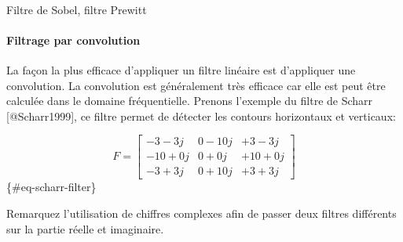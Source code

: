 \documentclass[11pt]{article}
\begin{document}
    \begin{center}
    \end{center}
    { \hspace*{\fill} \\}
    
    Filtre de Sobel, filtre Prewitt

\hypertarget{filtrage-par-convolution}{%
\paragraph{Filtrage par convolution}\label{filtrage-par-convolution}}

La façon la plus efficace d'appliquer un filtre linéaire est d'appliquer
une convolution. La convolution est généralement très efficace car elle
est peut être calculée dans le domaine fréquentielle. Prenons l'exemple
du filtre de Scharr {[}@Scharr1999{]}, ce filtre permet de détecter les
contours horizontaux et verticaux:

\[
F= \left[
\begin{array}{ccc}
-3-3j & 0-10j & +3-3j \\
-10+0j & 0+0j & +10+0j \\
-3+3j & 0+10j & +3+3j
\end{array}
\right]
\]\{\#eq-scharr-filter\}

Remarquez l'utilisation de chiffres complexes afin de passer deux
filtres différents sur la partie réelle et imaginaire.
\end{document}
